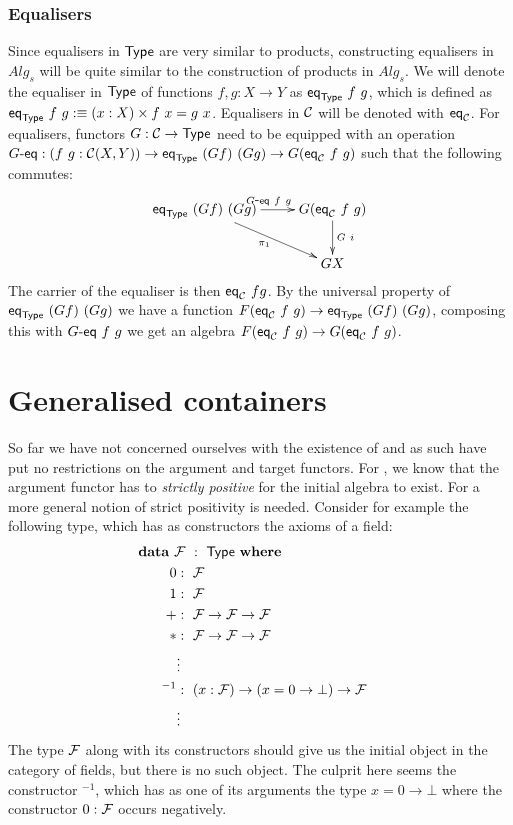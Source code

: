 \documentclass[a4paper,10pt]{report}
\begin{document}
\subsection{Equalisers}

Since equalisers in $\mathsf{Type}$ are very similar to products, constructing
equalisers in $Alg_s$ will be quite similar to the construction of
products in $Alg_s$. We will denote the equaliser in $\mathsf{Type}$ of
functions $f, g : X \to Y$ as $\mathsf{eq}_{\mathsf{Type}}\ f\ g$, which is defined as
$\mathsf{eq}_{\mathsf{Type}}\ f\ g :\equiv (x : X) \times f\ x = g\ x$. Equalisers in
$\mathcal{C}$ will be denoted with $\mathsf{eq}_{\mathcal{C}}$. For equalisers, functors
$G : \mathcal{C} \to \mathsf{Type}$ need to be equipped with an operation
$G\mbox{-}\mathsf{eq} : (f\ g : \mathcal{C}(X,Y)) \to \mathsf{eq}_{\mathsf{Type}}\ (G f)\ (G g) \to G (\mathsf{eq}_{\mathcal{C}}\
f\ g)$ such that the following commutes:
$$
\xymatrix{
\eq_{\Type}\ (G f)\ (G g)
 \ar[r]^{\Geq\ f\ g}
 \ar[rd]_{\pi_1}
&G (\eq_{\C}\ f\ g)
 \ar[d]^{G\ i} \\
&GX
}
$$
The carrier of the equaliser is then $\mathsf{eq}_{\mathcal{C}}\ f g$. By the universal
property of $\mathsf{eq}_{\mathsf{Type}}\ (G f)\ (G g)$ we have a function
$F (\eq_{\C}\ f\ g) \to \eq_{\Type}\ (G f)\ (G g)$, composing this
with $G\mbox{-}\mathsf{eq}\ f\ g$ we get an algebra
$F (\eq_{\C}\ f\ g) \to G (\eq_{\C}\ f\ g)$.

\chapter{Generalised containers}
\label{sec:gencontainers}

So far we have not concerned ourselves with the existence of \hits and
as such have put no restrictions on the argument and target
functors. For \oits, we know that the argument functor has to
\emph{strictly positive} for the initial algebra to exist. For \hits a
more general notion of strict positivity is needed. Consider for
example the following type, which has as constructors the axioms of a
field:
%
\begin{alignat*}{2}
&\rlap{$\data\ \initialfield\ :\ \Type\ \where$} \\
&&\ \ 0        &:\ \initialfield \\
&&\ \ 1        &:\ \initialfield \\
&&\ \ +        &:\ \initialfield \to \initialfield \to \initialfield \\
&&\ \ *        &:\ \initialfield \to \initialfield \to \initialfield \\
&&&\vdots \\
&&\ \ ^{-1}     &:\ (x : \initialfield) \to (x = 0 \to \bot) \to \initialfield \\
&&&\vdots
\end{alignat*}
%
The type $\mathcal{F}$ along with its constructors should give us
the initial object in the category of fields, but there is no such
object. The culprit here seems the constructor $^{-1}$, which has as
one of its arguments the type $x = 0 \to \bot$ where the constructor
$0 : \mathcal{F}$ occurs negatively.
\end{document}
